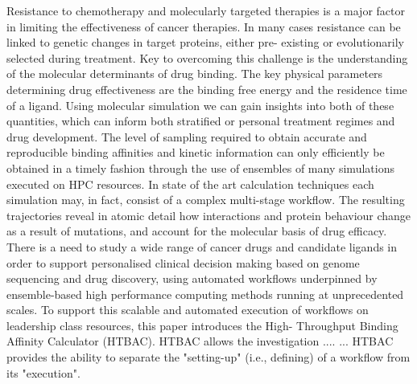 Resistance to chemotherapy and molecularly targeted therapies is a major
factor in limiting the effectiveness of cancer therapies. In many cases
resistance can be linked to genetic changes in target proteins, either pre-
existing or evolutionarily selected during treatment. Key to overcoming this
challenge is the understanding of the molecular determinants of drug binding.
The key physical parameters determining drug effectiveness are the binding
free energy and the residence time of a ligand. Using molecular simulation we
can gain insights into both of these quantities, which can inform both
stratified or personal treatment regimes and drug development. The level of
sampling required to obtain accurate and reproducible binding affinities and
kinetic information can only efficiently be obtained in a timely fashion
through the use of ensembles of many simulations executed on HPC resources. In
state of the art calculation techniques each simulation may, in fact, consist
of a complex multi-stage workflow. The resulting trajectories reveal in atomic
detail how interactions and protein behaviour change as a result of mutations,
and account for the molecular basis of drug efficacy. There is a need to study
a wide range of cancer drugs and candidate ligands in order to support
personalised clinical decision making based on genome sequencing and drug
discovery, using automated workflows underpinned by ensemble-based high
performance computing methods running at unprecedented scales. To support this
scalable and automated execution of workflows on leadership class resources,
this paper introduces the High- Throughput Binding Affinity Calculator (HTBAC).
HTBAC allows the investigation ....
... HTBAC provides the ability to separate the "setting-up" (i.e., defining) of a
workflow from its "execution".




